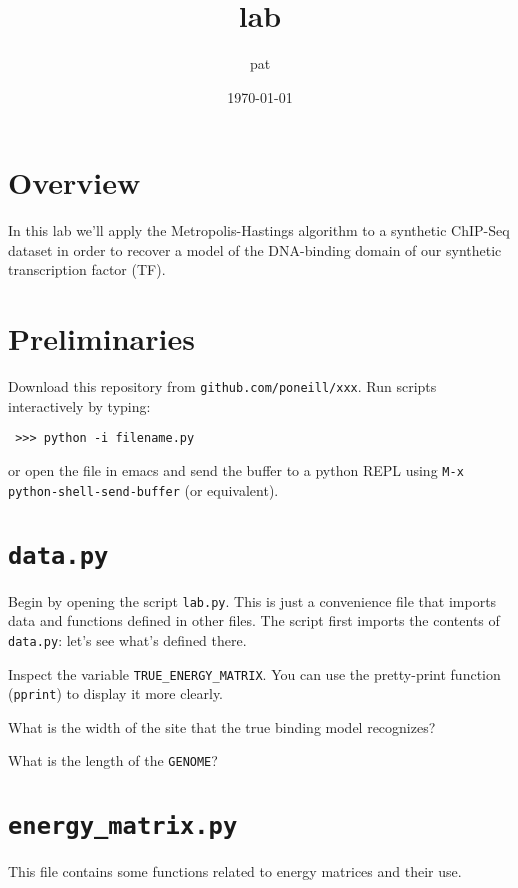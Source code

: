 \documentclass[11pt]{article}
\title{lab}
\author{pat}
\date{\today}
\begin{document}
\maketitle

\setcounter{tocdepth}{3}
\tableofcontents
\vspace*{1cm}

\section{Overview}
\label{sec-1}

  In this lab we'll apply the Metropolis-Hastings algorithm to a
  synthetic ChIP-Seq dataset in order to recover a model of the
  DNA-binding domain of our synthetic transcription factor (TF).
\section{Preliminaries}
\label{sec-2}

  Download this repository from \texttt{github.com/poneill/xxx}.  Run scripts
  interactively by typing:

\begin{verbatim}
 >>> python -i filename.py
\end{verbatim}

  or open the file in emacs and send the buffer to a python REPL using
  \texttt{M-x python-shell-send-buffer} (or equivalent).
\section{\texttt{data.py}}
\label{sec-3}

Begin by opening the script \texttt{lab.py}.  This is just a convenience file
that imports data and functions defined in other files.  The script
first imports the contents of \texttt{data.py}: let's see what's defined
there.  

Inspect the variable \texttt{TRUE\_ENERGY\_MATRIX}.  You can use the
pretty-print function (\texttt{pprint}) to display it more clearly.  

What is the width of the site that the true binding model recognizes?

What is the length of the \texttt{GENOME}?
\section{\texttt{energy\_matrix.py}}
\label{sec-4}


  This file contains some functions related to energy matrices and their use.
\end{document}
